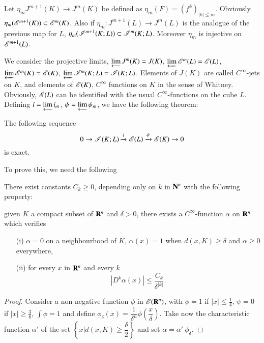 Let $\eta_{m}J^{m+1}(K)\to J^{m}(K)$ be defined as $\eta_{m}(F)=(f^{k})_{|k|\leq m}$. Obviously $\eta_{m}(\mathscr{E}^{m+1}(K))\subset \mathscr{E}^{m}(K)$. Also if $\eta_{m}:J^{m+1}(L)\to J^{m}(L)$ is the analogue of the previous map for $L$, $\eta_{m}(\mathscr{I}^{m+1}(K;L))\subset \mathscr{I}^{m}(K;L)$. Moreover $\eta_{m}$ is injective on $\mathscr{E}^{m+1}(L)$.

We consider the projective limits, $\varprojlim J^{m}(K)=J(K)$, $\varprojlim \mathscr{E}^{m}(L)=\mathscr{E}(L)$, $\varprojlim\mathscr{E}^{m}(K)=\mathscr{E}(K)$, $\varprojlim\mathscr{I}^{m}(K;L)=\mathscr{I}(K;L)$. Elements of $J(K)$ are called $C^{\infty}$-jets on $K$, and elements of $\mathscr{E}(K)$, $C^{\infty}$ functions on $K$ in the sense of Whitney. Obviously, $\mathscr{E}(L)$ can be identified with the usual $C^{\infty}$-functions on the cube $L$. Defining $i=\varprojlim i_{m}$, $\psi=\varprojlim \psi_{m}$, we have the following theorem:

\begin{theorem}\label{chap1-thm4.1}
The following sequence
$$
0\to \mathscr{I}(K;L)\xrightarrow{i}\mathscr{E}(L)\xrightarrow{\psi}\mathscr{E}(K)\to 0
$$
is exact.
\end{theorem}

To prove this, we need the following

\begin{lemma}\label{chap1-lem4.2}
There exist constants $C_{k}\geq 0$, depending only on $k$ in $\mathbf{N}^{n}$ with the following property:

given $K$ a compact subset of $\mathbf{R}^{n}$ and $\delta>0$, there exists a $C^{\infty}$-function $\alpha$ on $\mathbf{R}^{n}$ which verifies
\begin{itemize}
\item[\rm(i)] $\alpha=0$ on a neighbourhood of $K$, $\alpha(x)=1$ when $d(x,K)\geq \delta$ and $\alpha\geq 0$ everywhere,

\item[\rm(ii)] for every $x$ in $\mathbf{R}^{n}$ and every $k$
$$
|D^{k}\alpha(x)|\leq \dfrac{C_{k}}{\delta^{|k|}}.
$$
\end{itemize}
\end{lemma}

\begin{proof}
Consider a non-negative function $\phi$ in $\mathscr{E}(\mathbf{R}^{n})$, with $\phi=1$ if $|x|\leq \frac{1}{4}$, $\psi=0$ if $|x|\geq \frac{3}{8}$, $\int\phi=1$ and define $\phi_{\delta}(x)=\dfrac{1}{\delta^{n}}\phi\left(\dfrac{x}{\delta}\right)$. Take now the characteristic function $\alpha'$ of the set $\left\{x|d(x,K)\geq \dfrac{\delta}{2}\right\}$ and set $\alpha=\alpha' \ \phi_{\delta}$.
\end{proof}

